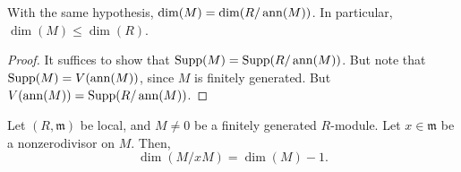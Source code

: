 \documentclass[12pt]{article}
\begin{document}
\begin{cor}
	With the same hypothesis, $\dim(M) = \dim(R/\operatorname{ann}(M))$. \newline
	In particular, $\dim(M) \le \dim(R)$.
\end{cor}
\begin{proof} 
	It suffices to show that $\operatorname{Supp}(M) = \operatorname{Supp}(R/\operatorname{ann}(M))$. But note that $\operatorname{Supp}(M) = V(\operatorname{ann}(M))$, since $M$ is finitely generated. But $V(\operatorname{ann}(M)) = \operatorname{Supp}(R/\operatorname{ann}(M))$.
\end{proof}

\begin{thm} \label{thm:nonzerodivisor-dimension-one-drop}
	Let $(R, \mathfrak{m})$ be local, and $M \neq 0$ be a finitely generated $R$-module. \newline
	Let $x \in \mathfrak{m}$ be a nonzerodivisor on $M$. Then,
	\begin{equation*} 
		\dim(M/xM) = \dim(M) - 1.
	\end{equation*}
\end{thm}
\end{document}
